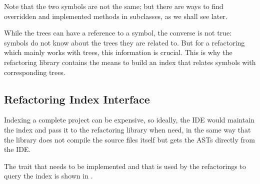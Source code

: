 Note that the two  symbols are not the same; but there are ways to find overridden and implemented methods in subclasses, as we shall see later.

While the trees can have a reference to a symbol, the converse is not true: symbols do not know about the trees they are related to. But for a refactoring which mainly works with trees, this information is crucial. This is why the refactoring library contains the means to build an index that relates symbols with corresponding trees.

\subsection{Refactoring Index Interface}

Indexing a complete project can be expensive, so ideally, the IDE would maintain the index and pass it to the refactoring library when need, in the same way that the library does not compile the source files itself but gets the ASTs directly from the IDE.

The trait that needs to be implemented and that is used by the refactorings to query the index is shown in .

